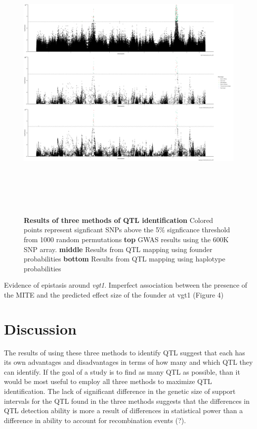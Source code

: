 \documentclass[article,9pt,twocolumn,twoside]{rilabRxiv}
\begin{document}
\begin{figure}[hb!]
\includegraphics[width=\textwidth,height=14cm]{figures/Methods_Fig3.png}
\caption{\textbf{Results of three methods of QTL identification} Colored points represent signficant SNPs above the 5\% signficance threshold from 1000 random permutations \textbf{top} GWAS results using the 600K SNP array. \textbf{middle} Results from QTL mapping using founder probabilities \textbf{bottom} Results from QTL mapping using haplotype probabilities}
\label{fig:figure3}
\end{figure}

Evidence of epistasis around \emph{vgt1}. Imperfect association between the presence of the MITE and the predicted effect size of the founder at vgt1 (Figure 4)




\section{Discussion}
The results of using these three methods to identify QTL suggest that each has its own advantages and disadvantages in terms of how many and which QTL they can identify. If the goal of a study is to find as many QTL as possible, than it would be most useful to employ all three methods to maximize QTL identification.
The lack of significant difference in the genetic size of support intervals for the QTL found in the three methods suggests that the differences in QTL detection ability is more a result of differences in statistical power than a difference in ability to account for recombination events (?).
\end{document}
